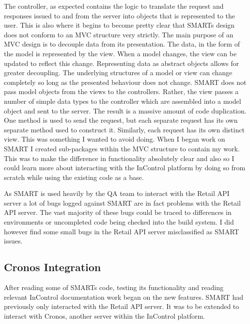 \documentclass[a4paper, 11pt, titlepage]{article}
\begin{document}
The controller, as expected contains the logic to translate the request and responses issued to and from the server into objects that is represented to the user. This is also where it begins to become pretty clear that SMARTs design does not conform to an MVC structure very strictly. The main purpose of an MVC design is to decouple data from its presentation. The data, in the form of the model is represented by the view. When a model changes, the view can be updated to reflect this change. Representing data as abstract objects allows for greater decoupling. The underlying structures of a model or view can change completely so long as the presented behaviour does not change. \cite{GOF}  SMART does not pass model objects from the views to the controllers. Rather, the view passes a number of simple data types to the controller which are assembled into a model object and sent to the server. The result is a massive amount of code duplication. One method is used to send the request, but each separate request has its own separate method used to construct it. Similarly, each request has its own distinct view. This was something I wanted to avoid doing.
When I began work on SMART I created sub-packages within the MVC structure to contain my work. This was to make the difference in functionality absolutely clear and also so I could learn more about interacting with the InControl platform by doing so from scratch while using the existing code as a base. 

As SMART is used heavily by the QA team to interact with the Retail API server a lot of bugs logged against SMART are in fact problems with the Retail API server. The vast majority of these bugs could be traced to differences in environments or uncompleted code being checked into the build system. I did however find some small bugs in the Retail API server misclassified as SMART issues. 
 
  
\subsection{Cronos Integration} 
After reading some of SMARTs code, testing its functionality and reading relevant InControl documentation work began on the new features. SMART had previously only interacted with the Retail API server. It was to be extended to interact with Cronos, another server within the InControl platform. 
 
\end{document}
